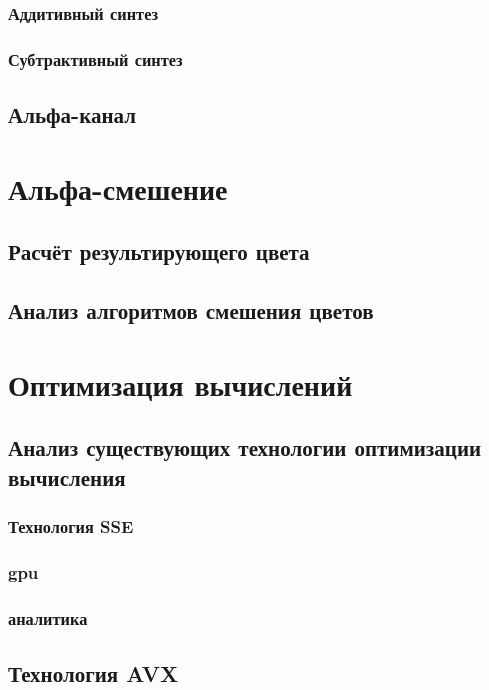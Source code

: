 \subsubsection{Аддитивный синтез}
\subsubsection{Субтрактивный синтез}
\subsection{Альфа-канал}

\section{Альфа-смешение}

\subsection{Расчёт результирующего цвета}

\subsection{Анализ  алгоритмов смешения цветов}
\subsection{}
\section{Оптимизация вычислений}
\subsection{Анализ существующих технологии оптимизации вычисления}
\subsubsection{Технология SSE}
\subsubsection{gpu}
\subsubsection{аналитика}
\subsection{Технология AVX}
